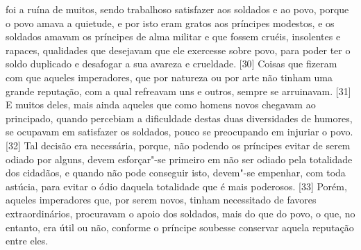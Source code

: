 foi a ruína de muitos, sendo trabalhoso satisfazer aos soldados e ao
povo, porque o povo amava a quietude, e por isto eram gratos aos
príncipes modestos, e os soldados amavam os príncipes de alma militar e
que fossem cruéis, insolentes e rapaces, qualidades que desejavam que
ele exercesse sobre povo, para poder ter o soldo duplicado e desafogar a
sua avareza e crueldade. {[}30{]} Coisas que fizeram com que aqueles
imperadores, que por natureza ou por arte não tinham uma grande reputação, com a qual refreavam
uns e outros, sempre se arruinavam. {[}31{]} E muitos deles, mais ainda
aqueles que como homens novos chegavam ao principado, quando percebiam a
dificuldade destas duas diversidades de humores, se ocupavam em
satisfazer os soldados, pouco se preocupando em injuriar o povo. {[}32{]}
Tal decisão era necessária, porque, não podendo os príncipes evitar de
serem odiado por alguns, devem esforçar"-se primeiro em não ser odiado
pela totalidade dos cidadãos, e quando não pode conseguir isto,
devem"-se empenhar, com toda astúcia, para evitar o ódio daquela
totalidade que é mais poderosos. {[}33{]} Porém, aqueles imperadores
que, por serem novos, tinham necessitado de favores extraordinários,
procuravam o apoio dos soldados, mais do que do povo, o que, no entanto,
era útil ou não, conforme o príncipe soubesse conservar aquela reputação
entre eles.

